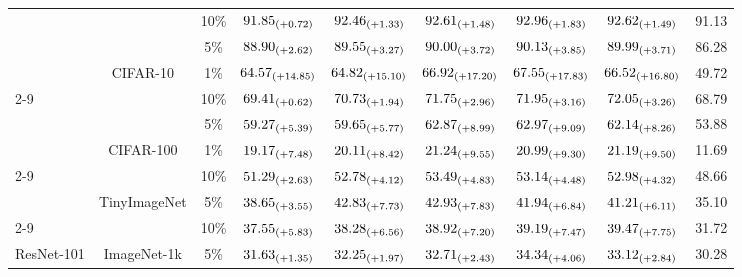 \begin{table}[!t]
{\begin{tabular}{lcccccccc}
    \multicolumn{1}{c}{} &  & 10\% & $91.85_{{\tiny(+0.72)}}$ & $92.46_{{\tiny(+1.33)}}$ & {\color{blue}$92.61_{{\tiny(+1.48)}}$} & {\color{red}\textbf{$92.96_{{\tiny(+1.83)}}$}} & {\color{blue}$92.62_{{\tiny(+1.49)}}$} & 91.13 \\
    \multicolumn{1}{c}{} &  & 5\% & $88.90_{{\tiny(+2.62)}}$ & $89.55_{{\tiny(+3.27)}}$ & {\color{blue}$90.00_{{\tiny(+3.72)}}$} & {\color{red}\textbf{$90.13_{{\tiny(+3.85)}}$}} & {\color{blue}$89.99_{{\tiny(+3.71)}}$} & 86.28 \\
    \multicolumn{1}{c}{} & \multirow{-3}{*}{CIFAR-10} & 1\% & $64.57_{{\tiny(+14.85)}}$ & $64.82_{{\tiny(+15.10)}}$ & {\color{blue}$66.92_{{\tiny(+17.20)}}$} & {\color{red}\textbf{$67.55_{{\tiny(+17.83)}}$}} & {\color{blue}$66.52_{{\tiny(+16.80)}}$}  & 49.72 \\ \cline{2-9}   
    \multicolumn{1}{c}{} &  & 10\% & $69.41_{{\tiny(+0.62)}}$ & $70.73_{{\tiny(+1.94)}}$ & {\color{blue}$71.75_{{\tiny(+2.96)}}$} & {\color{blue}$71.95_{{\tiny(+3.16)}}$} & {\color{red}\textbf{$72.05_{{\tiny(+3.26)}}$}} & 68.79 \\
    \multicolumn{1}{c}{} &  & 5\% & $59.27_{{\tiny(+5.39)}}$ & $59.65_{{\tiny(+5.77)}}$ & {\color{blue}$62.87_{{\tiny(+8.99)}}$} & {\color{red}\textbf{$62.97_{{\tiny(+9.09)}}$}} & {\color{blue}$62.14_{{\tiny(+8.26)}}$} & 53.88 \\
    & \multirow{-3}{*}{CIFAR-100} & 1\% & $19.17_{{\tiny(+7.48)}}$ & $20.11_{{\tiny(+8.42)}}$ & {\color{red}\textbf{$21.24_{{\tiny(+9.55)}}$}} & {\color{blue}$20.99_{{\tiny(+9.30)}}$} & {\color{blue}$21.19_{{\tiny(+9.50)}}$} & 11.69 \\ \cline{2-9}
    &  & 10\% & $51.29_{{\tiny(+2.63)}}$ & $52.78_{{\tiny(+4.12)}}$ & {\color{red}$53.49_{{\tiny(+4.83)}}$} & {\color{blue}$53.14_{{\tiny(+4.48)}}$} & {\color{blue}$52.98_{{\tiny(+4.32)}}$} & 48.66 \\
     & \multirow{-2}{*}{TinyImageNet} & 5\% & $38.65_{{\tiny(+3.55)}}$ & {\color{blue}$42.83_{{\tiny(+7.73)}}$} & {\color{red}$42.93_{{\tiny(+7.83)}}$} & {\color{blue}$41.94_{{\tiny(+6.84)}}$} & $41.21_{{\tiny(+6.11)}}$ & 35.10 \\ \cline{2-9}
    &  & 10\% & $37.55_{{\tiny(+5.83)}}$ & $38.28_{{\tiny(+6.56)}}$ & {\color{blue}$38.92_{{\tiny(+7.20)}}$} & {\color{blue}$39.19_{{\tiny(+7.47)}}$} & {\color{red}$39.47_{{\tiny(+7.75)}}$} & 31.72 \\
    \multirow{-10}{*}{ResNet-101} & \multirow{-2}{*}{ImageNet-1k} & 5\% & $31.63_{{\tiny(+1.35)}}$ & $32.25_{{\tiny(+1.97)}}$ & {\color{blue}$32.71_{{\tiny(+2.43)}}$} & {\color{red}$34.34_{{\tiny(+4.06)}}$} & {\color{blue}$33.12_{{\tiny(+2.84)}}$} & 30.28 \\ \hline

\end{tabular}}
\end{table}
